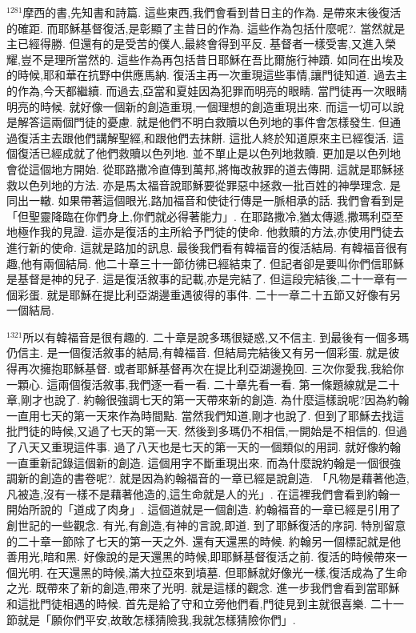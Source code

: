 \documentclass{book}
\begin{document}
$^{1281}$摩西的書,先知書和詩篇.
這些東西,我們會看到昔日主的作為.
是帶來末後復活的確距.
而耶穌基督復活,是彰顯了主昔日的作為.
這些作為包括什麼呢?.
當然就是主已經得勝.
但還有的是受苦的僕人,最終會得到平反.
基督者一樣受害,又進入榮耀,豈不是理所當然的.
這些作為再包括昔日耶穌在吾比爾施行神蹟.
如同在出埃及的時候,耶和華在抗野中供應馬納.
復活主再一次重現這些事情,讓門徒知道.
過去主的作為,今天都繼續.
而過去,亞當和夏娃因為犯罪而明亮的眼睛.
當門徒再一次眼睛明亮的時候.
就好像一個新的創造重現,一個理想的創造重現出來.
而這一切可以說是解答這兩個門徒的憂慮.
就是他們不明白救贖以色列地的事件會怎樣發生.
但通過復活主去跟他們講解聖經,和跟他們去抹餅.
這批人終於知道原來主已經復活.
這個復活已經成就了他們救贖以色列地.
並不單止是以色列地救贖.
更加是以色列地會從這個地方開始.
從耶路撒冷直傳到萬邦,將悔改赦罪的道去傳開.
這就是耶穌拯救以色列地的方法.
亦是馬太福音說耶穌要從罪惡中拯救一批百姓的神學理念.
是同出一轍.
如果帶著這個眼光,路加福音和使徒行傳是一脈相承的話.
我們會看到是「但聖靈降臨在你們身上,你們就必得著能力」.
在耶路撒冷,猶太傳遞,撒瑪利亞至地極作我的見證.
這亦是復活的主所給予門徒的使命.
他救贖的方法,亦使用門徒去進行新的使命.
這就是路加的訊息.
最後我們看有韓福音的復活結局.
有韓福音很有趣,他有兩個結局.
他二十章三十一節彷彿已經結束了.
但記者卻是要叫你們信耶穌是基督是神的兒子.
這是復活敘事的記載,亦是完結了.
但這段完結後,二十一章有一個彩蛋.
就是耶穌在提比利亞湖邊重遇彼得的事件.
二十一章二十五節又好像有另一個結局.

$^{1321}$所以有韓福音是很有趣的.
二十章是說多瑪很疑惑,又不信主.
到最後有一個多瑪仍信主.
是一個復活敘事的結局,有韓福音.
但結局完結後又有另一個彩蛋.
就是彼得再次擁抱耶穌基督.
或者耶穌基督再次在提比利亞湖邊挽回.
三次你愛我,我給你一顆心.
這兩個復活敘事,我們逐一看一看.
二十章先看一看.
第一條題線就是二十章,剛才也說了.
約翰很強調七天的第一天帶來新的創造.
為什麼這樣說呢?因為約翰一直用七天的第一天來作為時間點.
當然我們知道,剛才也說了.
但到了耶穌去找這批門徒的時候,又過了七天的第一天.
然後到多瑪仍不相信,一開始是不相信的.
但過了八天又重現這件事.
過了八天也是七天的第一天的一個類似的用詞.
就好像約翰一直重新記錄這個新的創造.
這個用字不斷重現出來.
而為什麼說約翰是一個很強調新的創造的書卷呢?.
就是因為約翰福音的一章已經是說創造.
「凡物是藉著他造,凡被造,沒有一樣不是藉著他造的,這生命就是人的光」.
在這裡我們會看到約翰一開始所說的「道成了肉身」.
這個道就是一個創造.
約翰福音的一章已經是引用了創世記的一些觀念.
有光,有創造,有神的言說,即道.
到了耶穌復活的序詞.
特別留意的二十章一節除了七天的第一天之外.
還有天還黑的時候.
約翰另一個標記就是他善用光,暗和黑.
好像說的是天還黑的時候,即耶穌基督復活之前.
復活的時候帶來一個光明.
在天還黑的時候,滿大拉亞來到墳墓.
但耶穌就好像光一樣,復活成為了生命之光.
既帶來了新的創造,帶來了光明.
就是這樣的觀念.
進一步我們會看到當耶穌和這批門徒相遇的時候.
首先是給了守和立旁他們看,門徒見到主就很喜樂.
二十一節就是「願你們平安,故敢怎樣猜險我,我就怎樣猜險你們」.
\end{document}
